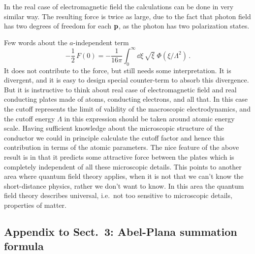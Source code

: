 In the real case of electromagnetic field the calculations can be done in very
similar way. The resulting force is twice as large, due to the fact that
photon field has two degrees of freedom for each $\mathbf{p}$, as the photon has two
polarization states.

Few words about the $a$-independent term
\[
-\frac12\,F(0)=-\frac1{16\pi}\int_0^\infty \dd\xi\,\sqrt\xi\;\Phi(\xi/\Lambda^2)\,.
\]
It does not contribute to the force, but still needs some interpretation. It
is divergent, and it is easy to design special counter-term to absorb this
divergence. But it is instructive to think about real case of electromagnetic
field and real conducting plates made of atoms, conducting electrons, and all
that. In this case the cutoff represents the limit of validity of the
macroscopic electrodynamics, and the cutoff energy $\Lambda$ in this
expression should be taken around atomic energy scale. Having sufficient
knowledge about the microscopic structure of the conductor we could in
principle calculate the cutoff factor and hence this contribution in terms of
the atomic parameters. The nice feature of the above result is in that it
predicts some attractive force between the plates which is completely
independent of all these microscopic details. This points to another area
where quantum field theory applies, when it is not that we can't know the
short-distance physics, rather we don't want to know. In this area the
quantum field theory describes universal, i.e.\ not too sensitive to
microscopic details, properties of matter.

\subsection*{Appendix to Sect.~3: Abel-Plana summation formula}

